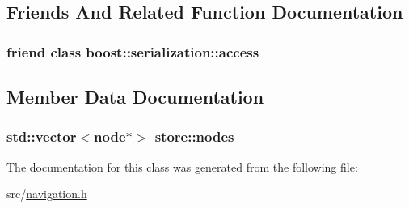 \subsection{\-Friends \-And \-Related \-Function \-Documentation}
\hypertarget{classstore_ac98d07dd8f7b70e16ccb9a01abf56b9c}{
\subsubsection[{boost\-::serialization\-::access}]{\setlength{\rightskip}{0pt plus 5cm}friend class boost\-::serialization\-::access}}\label{classstore_ac98d07dd8f7b70e16ccb9a01abf56b9c}


\subsection{\-Member \-Data \-Documentation}
\hypertarget{classstore_a38bffc57e2b230602490820c3ddc4a73}{
\subsubsection[{nodes}]{\setlength{\rightskip}{0pt plus 5cm}std\-::vector$<${\bf node}$\ast$$>$ {\bf store\-::nodes}}}\label{classstore_a38bffc57e2b230602490820c3ddc4a73}


\-The documentation for this class was generated from the following file\-:\begin{DoxyCompactItemize}
\item 
src/\hyperlink{navigation_8h}{navigation.\-h}\end{DoxyCompactItemize}
